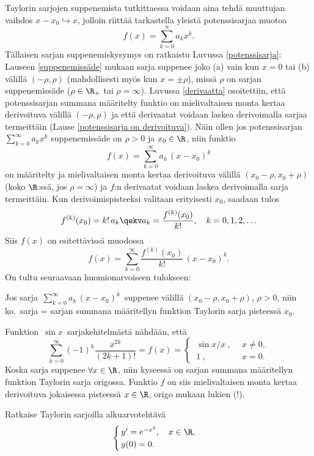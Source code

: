 Taylorin sarjojen suppenemista tutkittaessa voidaan aina tehdä muuttujan vaihdos 
$x-x_0\hookrightarrow x$, jolloin riittää tarkastella yleistä potenssisarjaa muotoa
\[ 
f(x) = \sum_{k=0}^n a_k x^k. 
\]
Tällaisen sarjan suppenemiskysymys on ratkaistu Luvussa \ref{potenssisarja}: Lauseen 
\ref{suppenemissäde} mukaan sarja suppenee joko (a) vain kun $x=0$ tai (b) välillä 
$(-\rho,\rho)$ (mahdollisesti myös kun $x = \pm \rho$), missä $\rho$ on sarjan suppenemissäde
($\rho \in \R_+$ tai $\rho = \infty$). Luvussa \ref{derivaatta} osoitettiin, että 
potenssisarjan summana määritelty funktio on mielivaltaisen monta kertaa derivoituva välillä 
$(-\rho,\rho)$ ja että derivaatat voidaan laskea derivoimalla sarjaa termeittäin
(Lause \ref{potenssisarja on derivoituva}). Näin ollen jos potenssisarjan
$\sum_{k=0}^\infty a_k x^k$ suppenemissäde on $\rho>0$ ja $x_0 \in \R$, niin funktio
\[ 
f(x) = \sum_{k=0}^\infty a_k\,(x-x_0)^k 
\]
on määritelty ja mielivaltaisen monta kertaa derivoituva välillä $(x_0-\rho,x_0+\rho)$ 
(koko $\R$:ssä, jos $\rho=\infty$) ja $f$:n derivaatat voidaan laskea derivoimalla sarja 
termeittäin. Kun derivoimispisteeksi valitaan erityisesti $x_0$, saadaan tulos
\[
f^{(k)}(x_0) = k!\,a_k \qekv a_k = \frac{f^{(k)}(x_0)}{k!}, \quad k = 0,1,2, \ldots 
\]
Siis $f(x)$ on esitettävissä muodossa
\[
f(x) = \sum_{k=0}^\infty \frac{f^{(k)}(x_0)}{k!}\,(x-x_0)^k.
\]
On tultu seuraavaan huomionarvoiseen tulokseen:
\begin{Lause} Jos sarja $\,\sum_{k=0}^\infty a_k\,(x-x_0)^k\,$ suppenee välillä 
$(x_0-\rho,x_0+\rho)$, $\rho>0$, niin ko.\ sarja = sarjan summana määritellyn funktion
Taylorin sarja pisteessä $x_0$.
\end{Lause}
\begin{Exa} \label{sinx/x}
Funktion $\,\sin x\,$ sarjakehitelmästä nähdään, että
\[
\sum_{k=0}^\infty (-1)^k\frac{x^{2k}}{(2k+1)!} = f(x) = \begin{cases}
                                                        \ \sin x/x\ , \ \ &x\neq 0, \\
                                                        \ 1\ ,            &x=0.
                                                        \end{cases}
\]
Koska sarja suppenee $\forall x\in\R$, niin kyseessä on sarjan summana määritellyn funktion 
Taylorin sarja origossa. Funktio $f$ on siis mielivaltaisen monta kertaa derivoituva
jokaisessa pisteessä $x\in\R$, origo mukaan lukien (!). \loppu
\end{Exa}
\begin{Exa} Ratkaise Taylorin sarjoilla alkuarvotehtävä
\[ \begin{cases} 
    \,y' = e^{-x^2}, \quad x \in \R, \\
    \,y(0) = 0.
\end{cases} \]
\end{Exa}
